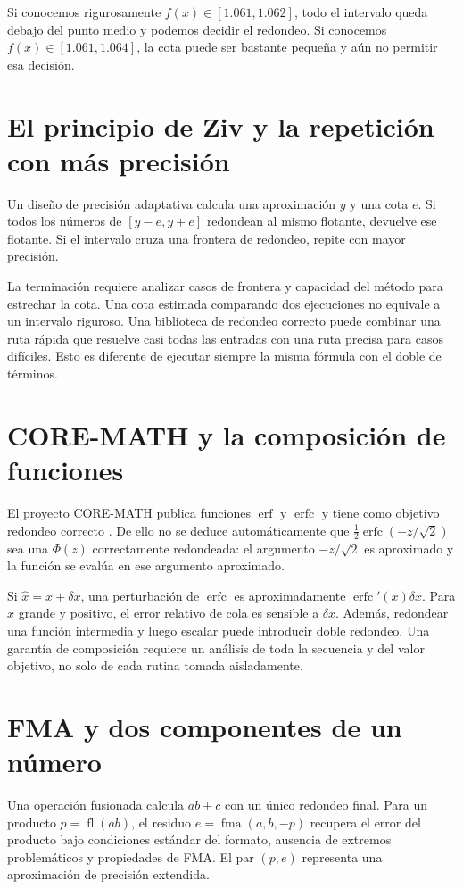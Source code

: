 \documentclass[11pt,a4paper]{article}
\theoremstyle{definition}
\DeclareMathOperator{\erf}{erf}
\DeclareMathOperator{\erfc}{erfc}
\begin{document}
Si conocemos rigurosamente $f(x)\in[1.061,1.062]$, todo el intervalo queda debajo del punto medio y podemos decidir el redondeo.
Si conocemos $f(x)\in[1.061,1.064]$, la cota puede ser bastante pequeña y aún no permitir esa decisión.

\section{El principio de Ziv y la repetición con más precisión}
Un diseño de precisión adaptativa calcula una aproximación $y$ y una cota $e$.
Si todos los números de $[y-e,y+e]$ redondean al mismo flotante, devuelve ese flotante.
Si el intervalo cruza una frontera de redondeo, repite con mayor precisión.

La terminación requiere analizar casos de frontera y capacidad del método para estrechar la cota.
Una cota estimada comparando dos ejecuciones no equivale a un intervalo riguroso.
Una biblioteca de redondeo correcto puede combinar una ruta rápida que resuelve casi todas las entradas con una ruta precisa para casos difíciles.
Esto es diferente de ejecutar siempre la misma fórmula con el doble de términos.

\section{CORE-MATH y la composición de funciones}
El proyecto CORE-MATH publica funciones $\erf$ y $\erfc$ y tiene como objetivo redondeo correcto \cite{coreactual}.
De ello no se deduce automáticamente que
$\tfrac12\erfc(-z/\sqrt2)$ sea una $\Phi(z)$ correctamente redondeada:
el argumento $-z/\sqrt2$ es aproximado y la función se evalúa en ese argumento aproximado.

Si $\widehat x=x+\delta x$, una perturbación de $\erfc$ es aproximadamente
$\erfc'(x)\delta x$.
Para $x$ grande y positivo, el error relativo de cola es sensible a $\delta x$.
Además, redondear una función intermedia y luego escalar puede introducir doble redondeo.
Una garantía de composición requiere un análisis de toda la secuencia y del valor objetivo, no solo de cada rutina tomada aisladamente.

\section{FMA y dos componentes de un número}
Una operación fusionada calcula $ab+c$ con un único redondeo final.
Para un producto $p=\operatorname{fl}(ab)$, el residuo
$e=\operatorname{fma}(a,b,-p)$ recupera el error del producto bajo condiciones estándar del formato, ausencia de extremos problemáticos y propiedades de FMA.
El par $(p,e)$ representa una aproximación de precisión extendida.
\end{document}
